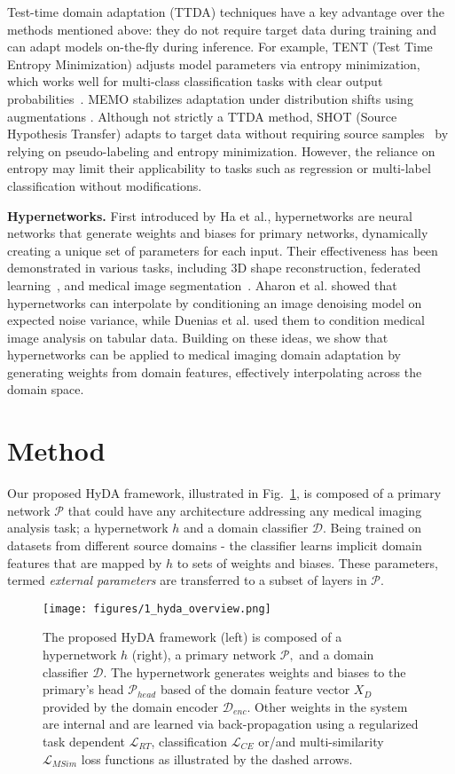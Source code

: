 \documentclass[runningheads]{llncs}
\begin{document}
Test-time domain adaptation (TTDA) techniques have a key advantage over the methods mentioned above: they do not require target data during training and can adapt models on-the-fly during inference. For example, TENT (Test Time Entropy Minimization) adjusts model parameters via entropy minimization, which works well for multi-class classification tasks with clear output probabilities~\cite{tta-tent}. MEMO stabilizes adaptation under distribution shifts using augmentations \cite{tta-memo}. Although not strictly a TTDA method, SHOT (Source Hypothesis Transfer) adapts to target data without requiring source samples~\cite{tta-shot} by relying on pseudo-labeling and entropy minimization. However, the reliance on entropy may limit their applicability to tasks such as regression or multi-label classification without modifications.


\textbf{Hypernetworks.}
First introduced by Ha et al.\cite{hypernetworks}, hypernetworks are neural networks that generate weights and biases for primary networks, dynamically creating a unique set of parameters for each input. Their effectiveness has been demonstrated in various tasks, including 3D shape reconstruction\cite{hyper-3d-rec}, federated learning~\cite{hyper-fed}, and medical image segmentation~\cite{hyper-med-seg}. Aharon et al.\cite{hyper-denoise} showed that hypernetworks can interpolate by conditioning an image denoising model on expected noise variance, while Duenias et al.\cite{hyperfusion} used them to condition medical image analysis on tabular data. Building on these ideas, we show that hypernetworks can be applied to medical imaging domain adaptation by generating weights from domain features, effectively interpolating across the domain space.
\section{Method}
Our proposed HyDA framework, illustrated in Fig.~\ref{fig:method-overview}, is composed of a primary network $\mathcal{P}$ that could have any architecture addressing any medical imaging analysis task; a hypernetwork $\mathit{h}$ and a domain classifier $\mathcal{D}.$ Being trained on datasets from different source domains - the classifier learns implicit domain features that are mapped by $\mathit{h}$ to sets of weights and biases. These parameters, termed \emph{external parameters} are transferred to a subset of layers in $\mathcal{P}.$ 
\begin{figure}[t!]
    \centering
    \texttt{[image: figures/1\_hyda\_overview.png]}
    \caption[]{
    The proposed HyDA framework (left) is composed of a hypernetwork $h$ (right), a primary network $\mathcal{P},$ and a domain classifier $\mathcal{D}.$ The hypernetwork generates weights and biases to the primary's head $\mathcal{P}_{head}$ based of the domain feature vector $X_D$ provided by the domain encoder $\mathcal{D}_{enc}$. Other weights in the system are internal and are learned via back-propagation using a regularized task dependent $\mathcal{L}_{RT}$, classification $\mathcal{L}_{CE}$ or/and multi-similarity $\mathcal{L}_{MSim}$ loss functions as illustrated by the dashed arrows. 
    }
    \label{fig:method-overview}
\end{figure}
\end{document}
